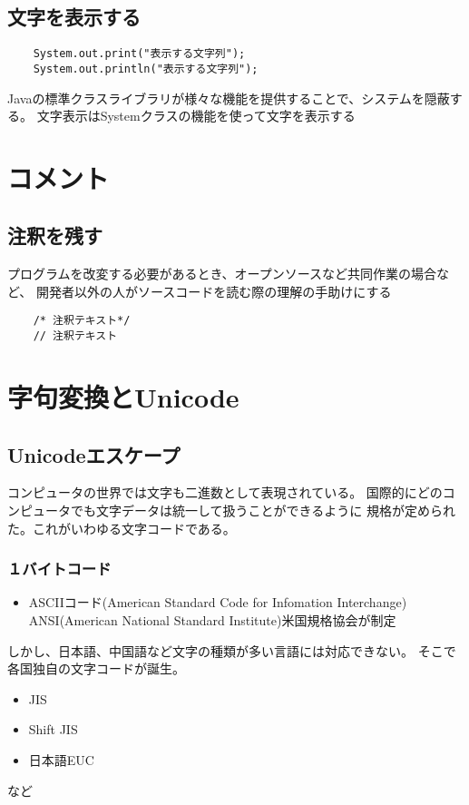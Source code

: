 \documentclass[12pt,a4j,twoside]{jsbook}
\begin{document}
\subsection{文字を表示する}
\begin{lstlisting}
    System.out.print("表示する文字列");
    System.out.println("表示する文字列");
\end{lstlisting}
Javaの標準クラスライブラリが様々な機能を提供することで、システムを隠蔽する。
文字表示はSystemクラスの機能を使って文字を表示する
\section{コメント}
\subsection{注釈を残す}
プログラムを改変する必要があるとき、オープンソースなど共同作業の場合など、
開発者以外の人がソースコードを読む際の理解の手助けにする
\begin{lstlisting}
    /* 注釈テキスト*/
    // 注釈テキスト
\end{lstlisting}

\section{字句変換とUnicode}
\subsection{Unicodeエスケープ}
コンピュータの世界では文字も二進数として表現されている。
国際的にどのコンピュータでも文字データは統一して扱うことができるように
規格が定められた。これがいわゆる文字コードである。

\subsubsection*{１バイトコード}
\begin{itemize}
    \item ASCIIコード(American Standard Code for Infomation Interchange)    ANSI(American National Standard Institute)米国規格協会が制定
\end{itemize}
しかし、日本語、中国語など文字の種類が多い言語には対応できない。
そこで各国独自の文字コードが誕生。
\begin{itemize}
    \item JIS
    \item Shift JIS
    \item 日本語EUC
\end{itemize}など
\end{document}
